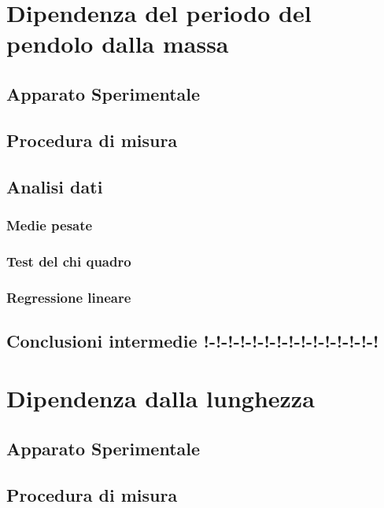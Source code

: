 \documentclass[11pt, twoside, a4paper]{article}
\begin{document}

\newpage

\newpage


\section{Dipendenza del periodo del pendolo dalla massa}
%
	\subsection{Apparato Sperimentale}
	
	\subsection{Procedura di misura}
	
	\subsection{Analisi dati}
		\subsubsection{Medie pesate}
		
		\subsubsection{Test del chi quadro}
		
		\subsubsection{Regressione lineare}
		
	\subsection{Conclusioni intermedie !-!-!-!-!-!-!-!-!-!-!-!-!-!-!}
	
\newpage
\section{Dipendenza dalla lunghezza}
	
	\subsection{Apparato Sperimentale}
	
	\subsection{Procedura di misura}
	
\end{document}
